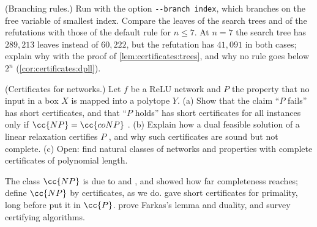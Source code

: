 \begin{refsection}
\begin{exercises}
\item \simulation (Branching rules.) Run  with the option \texttt{-{}-branch index}, which branches on the free variable of smallest index. Compare the leaves of the search trees and of the refutations with those of the default rule for $n\le7$. At $n=7$ the search tree has $289{,}213$ leaves instead of $60{,}222$, but the refutation has $41{,}091$ in both cases; explain why with the proof of \cref{lem:certificates:trees}, and why no rule goes below $2^n$ (\cref{cor:certificates:dpll}).\label{ex:certificates:branching}

\item \research (Certificates for networks.) Let $f$ be a ReLU network and $P$ the property that no input in a box $X$ is mapped into a polytope $Y$. (a) Show that the claim ``$P$ fails'' has short certificates, and that ``$P$ holds'' has short certificates for all instances only if $\cc{NP}=\cc{coNP}$ \parencite{KatzEtAl2017}. (b) Explain how a dual feasible solution of a linear relaxation certifies $P$ \parencite{WongKolter2018}, and why such certificates are sound but not complete. (c) Open: find natural classes of networks and properties with complete certificates of polynomial length.\label{ex:certificates:networks}
\end{exercises}

\notesandrefs
The class $\cc{NP}$ is due to \textcite{Cook1971} and \textcite{Levin1973}, and \textcite{Karp1972} showed how far completeness reaches; \textcite[Chapter~2]{AroraBarak2009} define $\cc{NP}$ by certificates, as we do. \Textcite{Pratt1975} gave short certificates for primality, long before \textcite{AgrawalKayalSaxena2004} put it in $\cc{P}$. \Textcite{MatousekGartner2007} prove Farkas's lemma and duality, and \textcite{McConnellEtAl2011} survey certifying algorithms.


\end{refsection}
